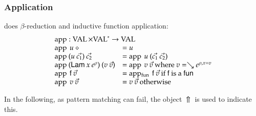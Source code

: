 \subsubsection{Application}
does $\beta$-reduction and inductive function application:
\[
\begin{array}{ll}
\multicolumn{2}{l}{\ap : \Val \times \ves{\Val} \ra \Val}\\
\ap \: u \: \diamond & = u \\
\ap \: (u \: \vec{c_1}) \: \vec{c_2} & = \ap \: u \: (\vec{c_1}\:\vec{c_2})\\
\ap \: (\vlam \: x \: \cl{e}{\rho}) \: (v \: \vec{v}) & = \ap \: v \: \vec{v} \mbox{ where } v = \wh \cl{e}{\ins{\rho}{x}{v}} \\ 
\ap \: \ff \: \vec{v} & = \apf \: \ff \: \vec{v} \mbox{ if } \ff \mbox{ is a } \fun \\ 
\ap \: v \: \vec{v} & = v \: \vec{v} \mbox{ otherwise } \\
\end{array}
\]

In the following, as pattern matching can fail, the object $\: \Uparrow \:$ is used to indicate this. 

